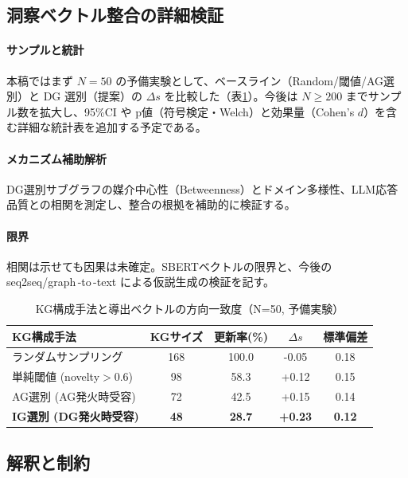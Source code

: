 \documentclass[ja=standard,xelatex]{bxjsarticle}
\begin{document}
\subsection{洞察ベクトル整合の詳細検証}\label{sec:insight_alignment_detail}
\paragraph{サンプルと統計}\; 本稿ではまず $N{=}50$ の予備実験として、ベースライン（Random/閾値/AG選別）と DG 選別（提案）の $\Delta s$ を比較した（表\ref{tab:insight_vector_preliminary}）。今後は $N\!\ge\!200$ までサンプル数を拡大し、95\%CI や p値（符号検定・Welch）と効果量（Cohen's $d$）を含む詳細な統計表を追加する予定である。\\
\paragraph{メカニズム補助解析}\; DG選別サブグラフの媒介中心性（Betweenness）とドメイン多様性、LLM応答品質との相関を測定し、整合の根拠を補助的に検証する。\\
\paragraph{限界}\; 相関は示せても因果は未確定。SBERTベクトルの限界と、今後の seq2seq/graph\,\mbox{-}to\,\mbox{-}text による仮説生成の検証を記す。

\begin{table}[H]
\centering
\caption{KG構成手法と導出ベクトルの方向一致度（N=50, 予備実験）}
\label{tab:insight_vector_preliminary}
\begin{tabular}{lcccc}
\toprule
KG構成手法 & KGサイズ & 更新率(\%) & $\Delta s$ & 標準偏差 \\
\midrule
ランダムサンプリング & 168 & 100.0 & -0.05 & 0.18 \\
単純閾値 (novelty$>$0.6) & 98 & 58.3 & +0.12 & 0.15 \\
AG選別 (AG発火時受容) & 72 & 42.5 & +0.15 & 0.14 \\
\textbf{IG選別 (DG発火時受容)} & \textbf{48} & \textbf{28.7} & \textbf{+0.23} & \textbf{0.12} \\
\bottomrule
\end{tabular}
\end{table}


\subsection{解釈と制約}
\end{document}
